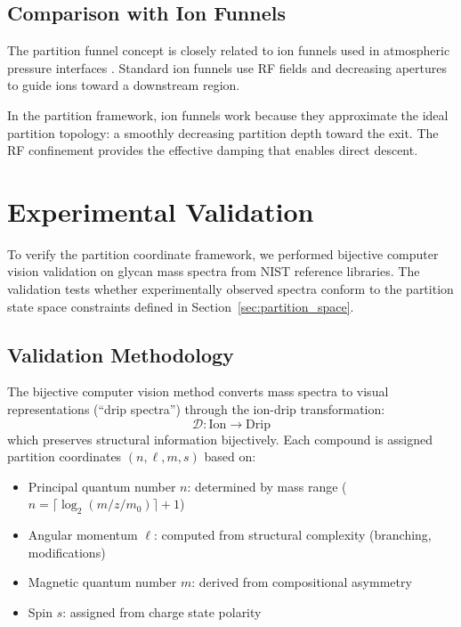 \documentclass[twocolumn,10pt,a4paper]{article}
\theoremstyle{definition}
\theoremstyle{remark}
\begin{document}
\subsection{Comparison with Ion Funnels}

The partition funnel concept is closely related to ion funnels used in atmospheric pressure interfaces \citep{shaffer1997}. Standard ion funnels use RF fields and decreasing apertures to guide ions toward a downstream region.

In the partition framework, ion funnels work because they approximate the ideal partition topology: a smoothly decreasing partition depth toward the exit. The RF confinement provides the effective damping that enables direct descent.



\section{Experimental Validation}
\label{sec:validation}

To verify the partition coordinate framework, we performed bijective computer vision validation on glycan mass spectra from NIST reference libraries. The validation tests whether experimentally observed spectra conform to the partition state space constraints defined in Section~\ref{sec:partition_space}.

\subsection{Validation Methodology}

The bijective computer vision method converts mass spectra to visual representations (``drip spectra'') through the ion-drip transformation:
\begin{equation}
    \mathcal{D}: \text{Ion} \to \text{Drip}
    \label{eq:ion_drip}
\end{equation}
which preserves structural information bijectively. Each compound is assigned partition coordinates $(n, \ell, m, s)$ based on:
\begin{itemize}
    \item Principal quantum number $n$: determined by mass range ($n = \lceil \log_2(m/z / m_0) \rceil + 1$)
    \item Angular momentum $\ell$: computed from structural complexity (branching, modifications)
    \item Magnetic quantum number $m$: derived from compositional asymmetry
    \item Spin $s$: assigned from charge state polarity
\end{itemize}
\end{document}
